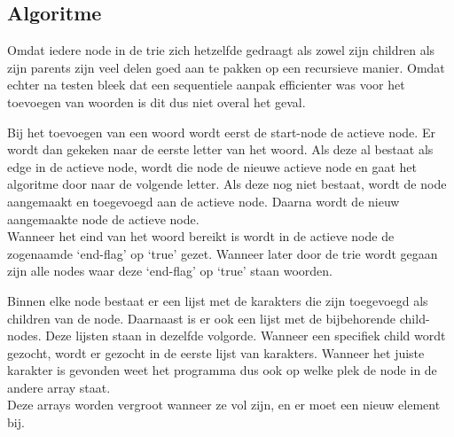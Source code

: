 \documentclass[a4paper,12pt]{article}
\begin{document}
\subsection{Algoritme}
Omdat iedere node in de trie zich hetzelfde gedraagt als zowel zijn children
als zijn parents zijn veel delen goed aan te pakken op een recursieve manier.
Omdat echter na testen bleek dat een sequentiele aanpak efficienter was voor
het toevoegen van woorden is dit dus niet overal het geval.

Bij het toevoegen van een woord wordt eerst de start-node de actieve node. Er
wordt dan gekeken naar de eerste letter van het woord. Als deze al bestaat als
edge in de actieve node, wordt die node de nieuwe actieve node en gaat het
algoritme door naar de volgende letter. Als deze nog niet bestaat, wordt de
node aangemaakt en toegevoegd aan de actieve node. Daarna wordt de nieuw
aangemaakte node de actieve node.\\
Wanneer het eind van het woord bereikt is wordt in de actieve node de
zogenaamde `end-flag' op `true' gezet. Wanneer later door de trie wordt gegaan
zijn alle nodes waar deze `end-flag' op `true' staan woorden.

Binnen elke node bestaat er een lijst met de karakters die zijn toegevoegd als
children van de node. Daarnaast is er ook een lijst met de bijbehorende
child-nodes. Deze lijsten staan in dezelfde volgorde. Wanneer een specifiek
child wordt gezocht, wordt er gezocht in de eerste lijst van karakters.
Wanneer het juiste karakter is gevonden weet het programma dus ook op welke
plek de node in de andere array staat.\\
Deze arrays worden vergroot wanneer ze vol zijn, en er moet een nieuw element
bij.



\pagebreak

\end{document}
